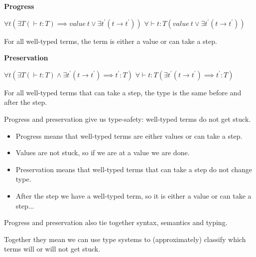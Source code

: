 \begin{frame}[c]

  {\bf Progress}

  \bigskip

  \begin{overprint}
  $\forall t \left(\exists T \left(\vdash t {:} T\right) \implies value~t \vee \exists t^{\prime}\left(t \longrightarrow t^{\prime}\right)\right)$
%
  $\forall \vdash t {:} T \left( value~t \vee \exists t^{\prime}\left(t \longrightarrow t^{\prime}\right)\right)$
  \end{overprint}

  \bigskip

  \begin{overprint}
  For all well-typed terms, the term is either a value or can take a step.
  \end{overprint}
\end{frame}

\begin{frame}[c]

  {\bf Preservation}

  \bigskip

  \begin{overprint}
  $\forall t \left( \exists T \left( \vdash t {:} T\right) \wedge \exists t^{\prime} \left(t \longrightarrow t^{\prime}\right) \implies t^{\prime} {:} T \right)$
%
  $\forall \vdash t {:} T \left(\exists t^{\prime} \left(t \longrightarrow t^{\prime}\right) \implies t^{\prime} {:} T \right)$
  \end{overprint}

  \bigskip

  \begin{overprint}
    For all well-typed terms that can take a step, the type is the same before
    and after the step.
  \end{overprint}
\end{frame}

\begin{frame}[c]
  Progress and preservation give us type-safety: well-typed terms do not get stuck.
  \begin{itemize}
  \item<1-> Progress means that well-typed terms are either values or can take a step.
  \item<2-> Values are not stuck, so if we are at a value we are done.
  \item<3-> Preservation means that well-typed terms that can take a step do not change type.
  \item<4-> After the step we have a well-typed term, so it is either a value or can
    take a step...
  \end{itemize}
\end{frame}

\begin{frame}[c]
  Progress and preservation also tie together syntax, semantics and typing.
\end{frame}

\begin{frame}[c]
  Together they mean we can use type systems to (approximately) classify which terms will or will not get stuck.
\end{frame}